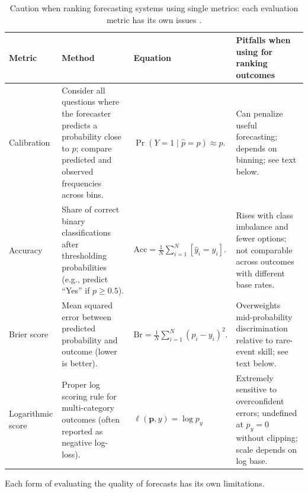 \documentclass[12pt,a4paper]{article}
\begin{document}
\begin{table}[htbp]
\centering
\caption{Caution when ranking forecasting systems using single metrics: each evaluation metric has its own issues .}
\label{tab:forecasting-metrics-pitfalls}
\renewcommand{\arraystretch}{1.2}
\setlength{\tabcolsep}{5pt}
\begin{tabular}{|p{}|p{}|p{}|p{}|}
\hline
\textbf{Metric} & \textbf{Method} & \textbf{Equation} & \textbf{Pitfalls when using for ranking outcomes} \\
\hline
Calibration &
Consider all questions where the forecaster predicts a probability close to $p$; compare predicted and observed frequencies across bins. &
$\Pr(Y=1 \mid \hat{p}=p) \approx p.$ &
Can penalize useful forecasting; depends on binning; see text below. \\
\hline
Accuracy &
Share of correct binary classifications after thresholding probabilities (e.g., predict ``Yes'' if $p \ge 0.5$). &
$\displaystyle \mathrm{Acc}=\frac{1}{N}\sum_{i=1}^N [\hat{y}_i = y_i].$ &
Rises with class imbalance and fewer options; not comparable across outcomes with different base rates. \\
\hline
Brier score &
Mean squared error between predicted probability and outcome (lower is better). &
$\displaystyle \mathrm{Br}=\frac{1}{N}\sum_{i=1}^N (p_i - y_i)^2.$ &
Overweights mid-probability discrimination relative to rare-event skill; see text below. \\
\hline

Logarithmic score &
Proper log scoring rule for multi-category outcomes (often reported as negative log-loss). &
$ \ell(\mathbf{p}, y)=\log{p_{y}}$ &
Extremely sensitive to overconfident errors; undefined at $p_{y}=0$ without clipping; scale depends on log base. \\
\hline


\hline


\end{tabular}
\end{table}

Each form of evaluating the quality of forecasts has its own limitations. 
\end{document}
